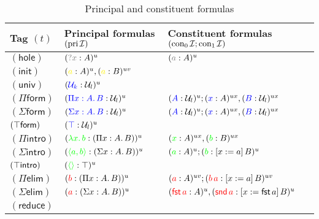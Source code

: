 \documentclass[twoside]{report}
\begin{document}
\begin{table}[ht]
    \centering
    \begin{tabular}{lll}\hline
    Tag $(t)$ & Principal formulas $(\operatorname{pri} \mathcal I)$ & Constituent formulas $({\operatorname{con}_0 \mathcal I}; {\operatorname{con}_1 \mathcal I})$ \\\hline
    $(\mathsf{hole})$ & $(\textcolor{gray}{?x} : A)^u$ & $(\textcolor{gray}a : A)^u$ \\
    $(\mathsf{init})$ & $(\textcolor{yellow}{a} : A)^u, (\textcolor{yellow}{a} : B)^{uv}$ & \\
    $(\mathsf{univ})$ & $(\textcolor{blue}{\mathcal U_k} : \mathcal U_l)^u$ & \\
    $(\Pi\mathsf{form})$ & $(\textcolor{blue}{\Pi{x} : {A}.\,{B}} : \mathcal U_l)^u$ & $(\textcolor{blue}{A} : \mathcal U_l)^u; (\textcolor{blue}{x} : A)^{ux}, (\textcolor{blue}{B} : \mathcal U_l)^{ux}$ \\
    $(\Sigma\mathsf{form})$ & $(\textcolor{blue}{\Sigma{x} : {A}.\,{B}} : \mathcal U_l)^u$ & $(\textcolor{blue}{A} : \mathcal U_l)^u; (\textcolor{blue}{x} : A)^{ux}, (\textcolor{blue}{B} : \mathcal U_l)^{ux}$ \\
    $(\top\mathsf{form})$ & $(\textcolor{blue}{\top} : \mathcal U_l)^u$ & \\
    $(\Pi\mathsf{intro})$ & $(\textcolor{green}{\lambda{x}.\,{b}} : (\Pi{x} : {A}.\,{B}))^u$ & $(\textcolor{green}{x} : A)^{ux}, (\textcolor{green}{b} : B)^{ux}$ \\
    $(\Sigma\mathsf{intro})$ & $(\textcolor{green}{\langle{a}, {b}\rangle} : (\Sigma{x} : {A}.\,{B}))^u$ & $(\textcolor{green}{a} : A)^u; (\textcolor{green}{b} : [{x}:={a}]\,{B})^u$ \\
    $(\top\mathsf{intro})$ & $(\textcolor{green}{\langle\rangle} : \top)^u$ & \\
    $(\Pi\mathsf{elim})$ & $(\textcolor{red}{b} : (\Pi{x} : {A}.\,{B}))^u$ & $(\textcolor{red}{a} : A)^{uv}; (\textcolor{red}{{b}\,{a}} : [{x}:={a}]\,{B})^{uv}$ \\
    $(\Sigma\mathsf{elim})$ & $(\textcolor{red}{a} : (\Sigma{x} : {A}.\,{B}))^u$ & $(\textcolor{red}{\operatorname{\mathsf{fst}} a} : A)^u, (\textcolor{red}{\operatorname{\mathsf{snd}} a} : [{x}:={\operatorname{\mathsf{fst}} a}]\,{B})^u$ \\
    $(\mathsf{reduce})$ & & \\\hline
    \end{tabular}
\caption{Principal and constituent formulas}
\label{tab:sequent_calculi_principal_and_constituent_formulas}
\end{table}

\end{document}
